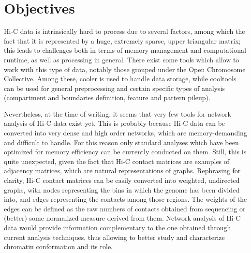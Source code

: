 \graphicspath{{chapters/03_objectives/}}
\chapter{Objectives}

Hi-C data is intrinsically hard to process due to several factors, among which the fact that it is represented by a huge, extremely sparse, upper triangular matrix; this leads to challenges both in terms of memory management and computational runtime, as well as processing in general. There exist some tools which allow to work with this type of data, notably those grouped under the Open Chromosome Collective\cite{openchromosomecollective}. Among these, cooler\cite{cooler2020} is used to handle data storage, while cooltools\cite{cooltools2022} can be used for general preprocessing and certain specific types of analysis (compartment and boundaries definition, feature and pattern pileup). 

Nevertheless, at the time of writing, it seems that very few tools for network analysis of Hi-C data exist yet\cite{chromatinnetworks2023}. This is probably because Hi-C data can be converted into very dense and high order networks, which are memory-demanding and difficult to handle. For this reason only standard analyses which have been optimized for memory efficiency can be currently conducted on them. Still, this is quite unexpected, given the fact that Hi-C contact matrices are examples of adjacency matrices, which are natural representations of graphs. Rephrasing for clarity, Hi-C contact matrices can be easily converted into weighted, undirected graphs, with nodes representing the bins in which the genome has been divided into, and edges representing the contacts among those regions. The weights of the edges can be defined as the raw numbers of contacts obtained from sequencing or (better) some normalized measure derived from them. Network analysis of Hi-C data would provide information complementary to the one obtained through current analysis techniques, thus allowing to better study and characterize chromatin conformation and its role. 

